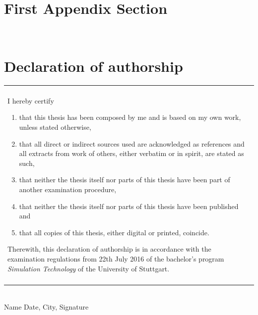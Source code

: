 \documentclass[twoside,a4paper]{article}
\begin{document}
%
%
\clearpage\newpage\null %
\newpage
\begin{appendices}
\section{First Appendix Section}

\newpage~\newpage
\section{Declaration of authorship}

\vspace{3cm}

\begin{table}[h!]
\centering
\begin{tabular}{|p{13cm}|}
\hline\\
	I hereby certify
	\begin{enumerate}
		\item that this thesis has been composed by me and is based on my own work, unless stated otherwise,
		\item that all direct or indirect sources used are acknowledged as references and all extracts from work of others, either verbatim or in spirit, are stated as such,
		\item that neither the thesis itself nor parts of this thesis have been part of another examination procedure,
		\item that neither the thesis itself nor parts of this thesis have been published and
		\item that all copies of this thesis, either digital or printed, coincide.
	\end{enumerate}
	Therewith, this declaration of authorship is in accordance with the examination regulations from 22th July 2016 of the bachelor's program \emph{Simulation Technology} of the University of Stuttgart.\\\\
\hline
\end{tabular}
\end{table}

\vspace{4cm}
\hrulefill\\
Name
\hspace{7cm}
Date, City, Signature
\end{appendices}
%
%
\clearpage\newpage\null %
\newpage
{}


\end{document}
